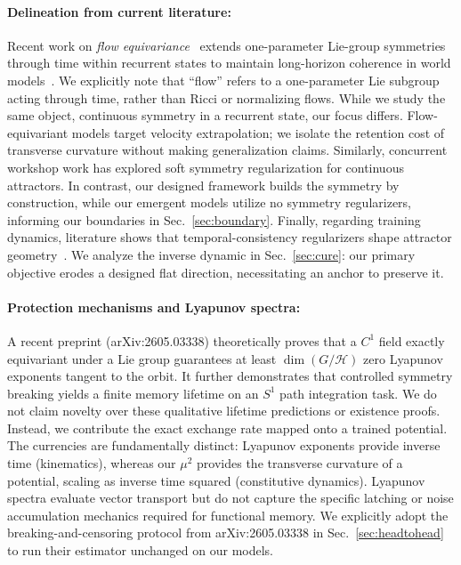 \documentclass[mlabstract,onecolumn]{jmlr}
\begin{document}
\paragraph{Delineation from current literature:} Recent work on \emph{flow equivariance}~\citep{keller_flow_2025} extends one-parameter Lie-group symmetries through time within recurrent states to maintain long-horizon coherence in world models~\citep{lillemark_flow_2026}. We explicitly note that ``flow'' refers to a one-parameter Lie subgroup acting through time, rather than Ricci or normalizing flows. While we study the same object, continuous symmetry in a recurrent state, our focus differs. Flow-equivariant models target velocity extrapolation; we isolate the retention cost of transverse curvature without making generalization claims. Similarly, concurrent workshop work has explored soft symmetry regularization for continuous attractors. In contrast, our designed framework builds the symmetry by construction, while our emergent models utilize no symmetry regularizers, informing our boundaries in Sec.~\ref{sec:boundary}. Finally, regarding training dynamics, literature shows that temporal-consistency regularizers shape attractor geometry~\citep{haputhanthri_understanding_2025}. We analyze the inverse dynamic in Sec.~\ref{sec:cure}: our primary objective erodes a designed flat direction, necessitating an anchor to preserve it.

\paragraph{Protection mechanisms and Lyapunov spectra:} A recent preprint (arXiv:2605.03338) theoretically proves that a $C^1$ field exactly equivariant under a Lie group guarantees at least $\dim(G/\mathcal H)$ zero Lyapunov exponents tangent to the orbit. It further demonstrates that controlled symmetry breaking yields a finite memory lifetime on an $S^1$ path integration task. We do not claim novelty over these qualitative lifetime predictions or existence proofs. Instead, we contribute the exact exchange rate mapped onto a trained potential. The currencies are fundamentally distinct: Lyapunov exponents provide inverse time (kinematics), whereas our $\mu^2$ provides the transverse curvature of a potential, scaling as inverse time squared (constitutive dynamics). Lyapunov spectra evaluate vector transport but do not capture the specific latching or noise accumulation mechanics required for functional memory. We explicitly adopt the breaking-and-censoring protocol from arXiv:2605.03338 in Sec.~\ref{sec:headtohead} to run their estimator unchanged on our models.
\end{document}
